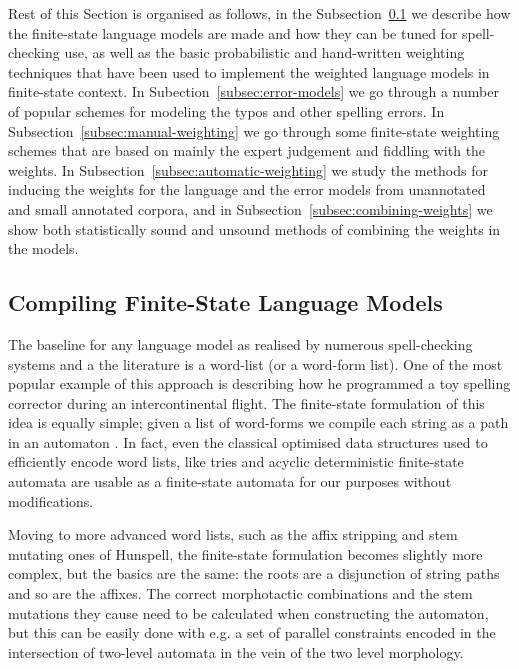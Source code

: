 \documentclass[a4paper,12pt]{article}
\begin{document}
Rest of this Section is organised as follows, in the
Subsection~\ref{subsec:language-models} we describe how the finite-state
language models are made and how they can be tuned for spell-checking use, as
well as the basic probabilistic and hand-written weighting techniques that have
been used to implement the weighted language models in finite-state context. In
Subection~\ref{subsec:error-models} we go through a number of popular schemes
for modeling the typos and other spelling errors.  In
Subsection~\ref{subsec:manual-weighting} we go through some finite-state
weighting schemes that are based on mainly the expert judgement and fiddling
with the weights.  In Subsection~\ref{subsec:automatic-weighting} we study the
methods for inducing the weights for the language and the error models from
unannotated and small annotated corpora, and in
Subsection~\ref{subsec:combining-weights} we show both statistically sound and
unsound methods of combining the weights in the models.

\subsection{Compiling Finite-State Language Models}
\label{subsec:language-models}

The baseline for any language model as realised by numerous
spell-checking systems and a the literature is a word-list (or a word-form
list). One of the most popular example of this approach
is \cite[]{norvig/2010} describing how he programmed a toy spelling corrector
during an intercontinental flight. The finite-state formulation of
this idea is equally simple; given a list of word-forms we compile each string
as a path in an automaton \cite[]{pirinen2012effects}. In fact, even the
classical optimised data structures used to efficiently encode word lists, like
tries and acyclic deterministic finite-state automata are usable as
a finite-state automata for our purposes without modifications.

Moving to more advanced word lists, such as the affix stripping and stem
mutating ones of Hunspell, the finite-state formulation becomes slightly more
complex, but the basics are the same: the roots are a disjunction of string
paths and so are the affixes. The correct morphotactic combinations and the
stem mutations they cause need to be calculated when constructing the
automaton, but this can be easily done with e.g. a set of parallel constraints
encoded in the intersection of two-level automata \cite[]{pirinen2010creating}
in the vein of the two level morphology.
\end{document}
